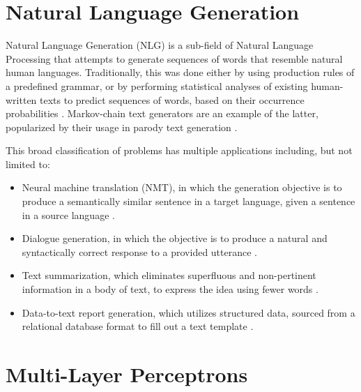 \section{Natural Language Generation}

Natural Language Generation (NLG) is a sub-field of Natural Language Processing that attempts to generate sequences of words that resemble natural human languages. Traditionally, this was done either by using production rules of a predefined grammar, or by performing statistical analyses of existing human-written texts to predict sequences of words, based on their occurrence probabilities \citep{cambria2014jumping}. Markov-chain text generators are an example of the latter, popularized by their usage in parody text generation \cite{jelinek1985markov}.

This broad classification of problems has multiple applications including, but not limited to:
\begin{itemize}
	\item Neural machine translation (NMT), in which the generation objective is to produce a semantically similar sentence in a target language, given a sentence in a source language \citep{bahdanau2014neural,cho2014properties,luong2015effective,wu2016google}.
	\item Dialogue generation, in which the objective is to produce a natural and syntactically correct response to a provided utterance \citep{cavazza2005dialogue,li2016persona,li2016deep,li2017adversarial}.
	\item Text summarization, which eliminates superfluous and non-pertinent information in a body of text, to express the idea using fewer words \citep{barzilay1999using,gong2001generic,conroy2001text}.
	\item Data-to-text report generation, which utilizes structured data, sourced from a relational database format to fill out a text template \citep{goldberg1994using,reiter2007architecture,gatt2009data}.
\end{itemize}


\section{Multi-Layer Perceptrons}


